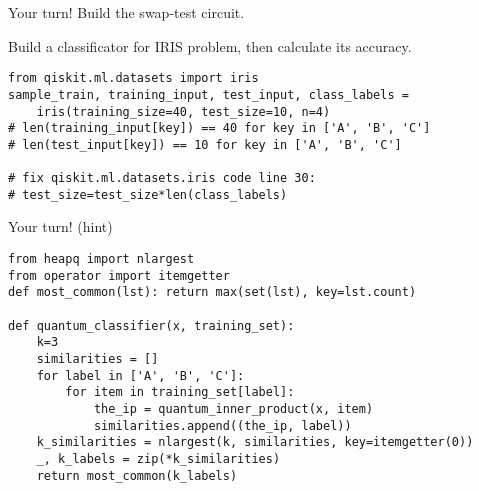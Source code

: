 \begin{frame}[fragile]{Your turn!}
Build the swap-test circuit.

Build a classificator for IRIS problem, then calculate its accuracy. \bigskip

\begin{verbatim}
from qiskit.ml.datasets import iris
sample_train, training_input, test_input, class_labels = 
    iris(training_size=40, test_size=10, n=4)
# len(training_input[key]) == 40 for key in ['A', 'B', 'C']
# len(test_input[key]) == 10 for key in ['A', 'B', 'C']

# fix qiskit.ml.datasets.iris code line 30: 
# test_size=test_size*len(class_labels)
\end{verbatim}
\end{frame}


\begin{frame}[fragile]{Your turn! (hint)}

\begin{verbatim}
from heapq import nlargest
from operator import itemgetter
def most_common(lst): return max(set(lst), key=lst.count)

def quantum_classifier(x, training_set):
    k=3
    similarities = []
    for label in ['A', 'B', 'C']:
        for item in training_set[label]:
            the_ip = quantum_inner_product(x, item)
            similarities.append((the_ip, label))
    k_similarities = nlargest(k, similarities, key=itemgetter(0))
    _, k_labels = zip(*k_similarities)
    return most_common(k_labels)
\end{verbatim}
\end{frame}


